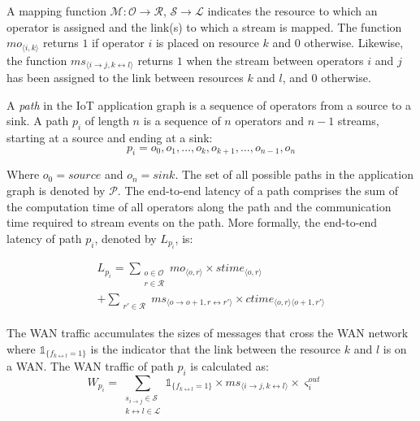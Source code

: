 A mapping function $\mathcal{M} : \mathcal{O} \rightarrow \mathcal{R}$, $\mathcal{S} \rightarrow \mathcal{L}$ indicates the resource to which an operator is assigned and the link(s) to which a stream is mapped. The function $mo_{\langle i,k\rangle}$ returns $1$ if operator $i$ is placed on resource $k$ and $0$ otherwise. Likewise, the function $ms_{\langle i\rightarrow j,k\leftrightarrow l\rangle}$ returns $1$ when the stream between operators $i$ and $j$ has been assigned to the link between resources $k$ and $l$, and $0$ otherwise.

A \textit{path} in the \ac{IoT} application graph is a sequence of operators from a source to a sink. A path $p_i$ of length $n$ is a sequence of $n$ operators and $n-1$ streams, starting at a source and ending at a sink:
\begin{equation}
p_i = o_{0},o_{1},\dots,o_{k},o_{k+1},\dots,o_{n-1}, o_{n} 
\end{equation}
  
Where $o_0=source$ and $o_n=sink$. The set of all possible paths in the application graph is denoted by $\mathcal{P}$. The end-to-end latency of a path comprises the sum of the computation time of all operators along the path and the communication time required to stream events on the path. More formally, the end-to-end latency of path $p_i$, denoted by $L_{p_i}$, is:


\begin{equation} \label{eq:latency}
  \begin{split}
  L_{p_i} =
  \sum_{\substack{o\in \mathcal{O} \\
                  r\in\mathcal{R}
                 }
        } 
   mo_{\langle o,r\rangle} \times stime_{\langle o,r\rangle} \\
   + \sum_{\substack{r'\in\mathcal{R}
                    }
         }    
   ms_{\langle o\rightarrow o+1,r\leftrightarrow r'\rangle} \times ctime_{\langle o, r\rangle\langle o+1,r'\rangle}      
  \end{split}   
\end{equation}

The WAN traffic accumulates the sizes of messages that cross the WAN network where $\mathbb{1}_{\{f_{k\leftrightarrow l} = 1\}}$ is the indicator that the link between the resource $k$ and $l$ is on a WAN. The WAN traffic of path $p_i$ is calculated as:
\begin{equation}
      W_{p_i} = \sum\limits_{
 \substack{s_{i\rightarrow j}\in\mathcal{S}\\
 k \leftrightarrow l\in\mathcal{L}
 }
 }{
    \mathbb{1}_{\{f_{k\leftrightarrow l} = 1\} } \times ms_{\langle i\rightarrow j,k\leftrightarrow l\rangle} \times \varsigma_i^{out}\quad 
 }
  \label{eq:traffic}
\end{equation}

